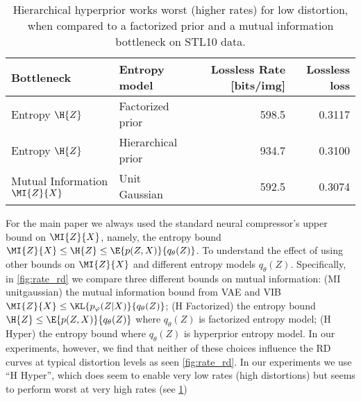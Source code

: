 \documentclass[final]{article}
\begin{document}
\begin{table}[h]
\caption{Hierarchical hyperprior works worst (higher rates) for low distortion, when compared to a factorized prior and a mutual information bottleneck on STL10 data.
}
\begin{center}
\small
\begin{tabular}{llrr}
\toprule
Bottleneck & Entropy model & Lossless Rate [bits/img] & Lossless loss\\ 
\midrule 
Entropy $\H{Z}$      &Factorized prior \cite{balle_variational_2018} 		               & 598.5 	& 0.3117 \\
Entropy $\H{Z}$       &Hierarchical prior \cite{balle_variational_2018}  & 934.7  & 0.3100 \\ 
Mutual Information $\MI{Z}{X}$      & Unit Gaussian 	                                                   & 592.5  & 0.3074 \\
\bottomrule
\end{tabular}
\end{center}
\label{table:rate_variation_aurd}
\end{table} 
For the main paper we always used the standard \cite{balle_end--end_2017} neural compressor's upper bound on $\MI{Z}{X}$, namely, the entropy bound $\MI{Z}{X} \leq \H{Z} \leq \E{p(Z,X)}{q_{\theta}(Z)}$.
To understand the effect of using other bounds on $\MI{Z}{X}$ and different entropy models $q_{\theta}(Z)$.
Specifically, in \cref{fig:rate_rd} we compare three different bounds on mutual information:
(MI unitgaussian) the mutual information bound from VAE and VIB $\MI{Z}{X} \leq \KL{p_{\varphi}(Z|X)}{q_{\theta}(Z)}$;
(H Factorized) the entropy bound $\H{Z} \leq \E{p(Z,X)}{q_{\theta}(Z)}$ where $q_{\theta}(Z)$ is  factorized entropy model;
(H Hyper) the entropy bound where $q_{\theta}(Z)$ is  hyperprior entropy model.
In our experiments, however, we find that neither of these choices influence the RD curves at typical distortion levels as seen \cref{fig:rate_rd}. 
In our experiments we use ``H Hyper'', which does seem to enable very low rates (high distortions) but seems to perform worst at very high rates (see \cref{table:rate_variation_aurd})


\end{document}
